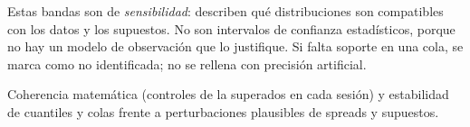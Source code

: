 
\begin{noconcluir}
Estas bandas son de \emph{sensibilidad}: describen qué distribuciones son compatibles con los datos y los
supuestos. No son intervalos de confianza estadísticos, porque no hay un modelo de observación que lo
justifique. Si falta soporte en una cola, se marca como no identificada; no se rellena con precisión
artificial.
\end{noconcluir}

\begin{criterio}
Coherencia matemática (controles de la  superados en cada sesión) y estabilidad de
cuantiles y colas frente a perturbaciones plausibles de spreads y supuestos.
\end{criterio}
